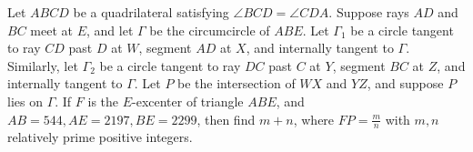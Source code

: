 Let $ABCD$ be a quadrilateral satisfying $\angle BCD=\angle CDA$. Suppose rays $AD$ and $BC$ meet at $E$, and let $\Gamma$ be the circumcircle of $ABE$. Let $\Gamma_1$ be a circle tangent to ray $CD$ past $D$ at $W$, segment $AD$ at $X$, and internally tangent to $\Gamma$. Similarly, let $\Gamma_2$ be a circle tangent to ray $DC$ past $C$ at $Y$, segment $BC$ at $Z$, and internally tangent to $\Gamma$. Let $P$ be the intersection of $WX$ and $YZ$, and suppose $P$ lies on $\Gamma$. If $F$ is the $E$-excenter of triangle $ABE$, and $AB=544,AE=2197,BE=2299$, then find $m+n$, where $FP=\frac{m}{n}$ with $m,n$ relatively prime positive integers.
